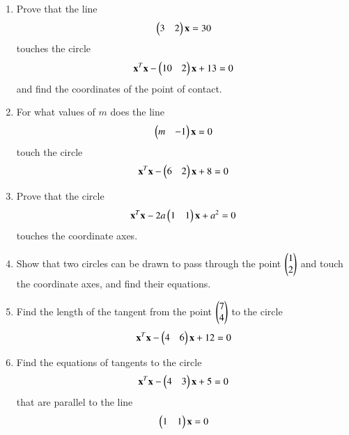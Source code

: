 \begin{enumerate}[label=\arabic*.,ref=\thesubsection.\theenumi]
\item Prove that the line 
\begin{align}
\begin{pmatrix}3 &2\end{pmatrix}\mathbf{x}=30 \label{eq:solutions/4/2/3/given_line_eq}
\end{align}
touches the circle
\begin{align}
\mathbf{x}^T\mathbf{x}-\begin{pmatrix}10 & 2\end{pmatrix}\mathbf{x}+13 = 0 \label{eq:solutions/4/2/3/given_circle_eq}
\end{align}
and find the coordinates of the point of contact.
%
\solution

\item For what values of $m$ does the line 
\begin{align}
\begin{pmatrix}m &-1\end{pmatrix}\mathbf{x}=0
\label{eq:solutions/4/2/4/1.1}
\end{align}
touch the circle
\begin{align}
\mathbf{x}^T\mathbf{x}-\begin{pmatrix}6 & 2\end{pmatrix}\mathbf{x}+8 = 0 \label{eq:solutions/4/2/4/1.2}
\end{align}
\solution

\renewcommand{\theequation}{\theenumi}
\item Prove that the circle 
\begin{align}
\mathbf{x}^T\mathbf{x}-2a\begin{pmatrix}1 & 1\end{pmatrix}\mathbf{x}+a^2 = 0
\label{eq:solutions/4/2/5/eq1}
\end{align}
touches the coordinate axes.
\solution

\item Show that two circles can be drawn to pass through the point $\begin{pmatrix}1\\2\end{pmatrix}$ and touch the coordinate axes, and find their equations.
\solution
%
\item Find the length of the tangent from the point $\begin{pmatrix}7\\4\end{pmatrix}$ to the circle 
\begin{align}
\mathbf{x}^T\mathbf{x}-\begin{pmatrix}4 & 6\end{pmatrix}\mathbf{x}+12 = 0
\end{align}
\item  Find the equations of tangents to the circle 
\begin{align}
\mathbf{x}^T\mathbf{x}-\begin{pmatrix}4 & 3\end{pmatrix}\mathbf{x}+5 = 0 \label{eq:solutions/4/2/8/given_circle_eq}
\end{align}
that are parallel to the line
\begin{align}
\begin{pmatrix}1 &1\end{pmatrix}\mathbf{x}=0 \label{eq:solutions/4/2/8/given_line_eq}
\end{align}
%
\solution

\renewcommand{\theequation}{\theenumi}

\end{enumerate}
